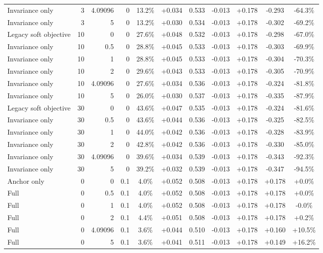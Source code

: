 \begin{table}[htbp]
\begin{tabular}{lrrrccccccc}
Invariance only & 3 & 4.09096 & 0 & 13.2\% & +0.034 & 0.533 & -0.013 & +0.178 & -0.293 & -64.3\% \\
Invariance only & 3 & 5 & 0 & 13.2\% & +0.030 & 0.534 & -0.013 & +0.178 & -0.302 & -69.2\% \\
Legacy soft objective & 10 & 0 & 0 & 27.6\% & +0.048 & 0.532 & -0.013 & +0.178 & -0.298 & -67.0\% \\
Invariance only & 10 & 0.5 & 0 & 28.8\% & +0.045 & 0.533 & -0.013 & +0.178 & -0.303 & -69.9\% \\
Invariance only & 10 & 1 & 0 & 28.8\% & +0.045 & 0.533 & -0.013 & +0.178 & -0.304 & -70.3\% \\
Invariance only & 10 & 2 & 0 & 29.6\% & +0.043 & 0.533 & -0.013 & +0.178 & -0.305 & -70.9\% \\
Invariance only & 10 & 4.09096 & 0 & 27.6\% & +0.034 & 0.536 & -0.013 & +0.178 & -0.324 & -81.8\% \\
Invariance only & 10 & 5 & 0 & 26.0\% & +0.030 & 0.537 & -0.013 & +0.178 & -0.335 & -87.9\% \\
Legacy soft objective & 30 & 0 & 0 & 43.6\% & +0.047 & 0.535 & -0.013 & +0.178 & -0.324 & -81.6\% \\
Invariance only & 30 & 0.5 & 0 & 43.6\% & +0.044 & 0.536 & -0.013 & +0.178 & -0.325 & -82.5\% \\
Invariance only & 30 & 1 & 0 & 44.0\% & +0.042 & 0.536 & -0.013 & +0.178 & -0.328 & -83.9\% \\
Invariance only & 30 & 2 & 0 & 42.8\% & +0.042 & 0.536 & -0.013 & +0.178 & -0.330 & -85.0\% \\
Invariance only & 30 & 4.09096 & 0 & 39.6\% & +0.034 & 0.539 & -0.013 & +0.178 & -0.343 & -92.3\% \\
Invariance only & 30 & 5 & 0 & 39.2\% & +0.032 & 0.539 & -0.013 & +0.178 & -0.347 & -94.5\% \\
Anchor only & 0 & 0 & 0.1 & 4.0\% & +0.052 & 0.508 & -0.013 & +0.178 & +0.178 & +0.0\% \\
Full & 0 & 0.5 & 0.1 & 4.0\% & +0.052 & 0.508 & -0.013 & +0.178 & +0.178 & +0.0\% \\
Full & 0 & 1 & 0.1 & 4.0\% & +0.052 & 0.508 & -0.013 & +0.178 & +0.178 & -0.0\% \\
Full & 0 & 2 & 0.1 & 4.4\% & +0.051 & 0.508 & -0.013 & +0.178 & +0.178 & +0.2\% \\
Full & 0 & 4.09096 & 0.1 & 3.6\% & +0.044 & 0.510 & -0.013 & +0.178 & +0.160 & +10.5\% \\
Full & 0 & 5 & 0.1 & 3.6\% & +0.041 & 0.511 & -0.013 & +0.178 & +0.149 & +16.2\% \\

\end{tabular}
\end{table}
